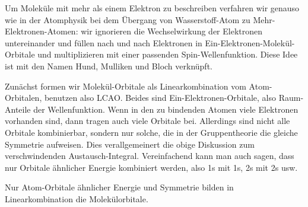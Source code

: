Um Moleküle mit mehr als einem Elektron zu beschreiben verfahren wir genauso wie in der Atomphysik bei dem Übergang von Wasserstoff-Atom zu Mehr-Elektronen-Atomen: wir ignorieren die Wechselwirkung der Elektronen untereinander und füllen nach und nach Elektronen in Ein-Elektronen-Molekül-Orbitale und multiplizieren mit einer passenden Spin-Wellenfunktion. Diese Idee ist mit den Namen Hund, Mulliken und Bloch verknüpft.

Zunächst formen wir Molekül-Orbitale als Linearkombination vom Atom-Orbitalen, benutzen also LCAO. Beides sind Ein-Elektronen-Orbitale, also Raum-Anteile der Wellenfunktion. Wenn in den zu bindenden Atomen viele Elektronen vorhanden sind, dann tragen auch viele Orbitale bei.  Allerdings sind nicht alle Orbitale kombinierbar, sondern nur solche, die in der Gruppentheorie die gleiche Symmetrie aufweisen. Dies verallgemeinert die obige Diskussion zum verschwindenden Austausch-Integral. Vereinfachend kann man auch sagen, dass nur Orbitale ähnlicher Energie kombiniert werden, also 1s mit 1s, 2s mit 2s usw. 

\begin{marginfigure}
\centering

 \begin{modiagram}[labels, names, AO-width=6pt, distance=3cm]
 

    
\end{modiagram}
\caption{Nur Atom-Orbitale ähnlicher Energie und Symmetrie bilden in Linearkombination die Molekülorbitale. }
\end{marginfigure}



